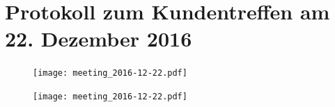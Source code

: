 \documentclass[12pt]{scrartcl}
\newcommand{\textMeetingSecond}{Protokoll zum Kundentreffen am 22. Dezember 2016}
\begin{document}
	\section{\textMeetingSecond}
	\label{\textMeetingSecond}
	\begin{figure}[h!]
		\centering
		\texttt{[image: meeting\_2016-12-22.pdf]}
	\end{figure}  	
	
	\begin{figure}[h!]
		\centering
		\texttt{[image: meeting\_2016-12-22.pdf]}
	\end{figure}  		
	
	\clearpage
	
	
	\clearpage
	
	
	\clearpage
	
	
	\clearpage
	
	
	\clearpage
	
	
	\clearpage
	\listoffigures
	
	\clearpage
	\printbibliography[heading=bibintoc]
\end{document}
